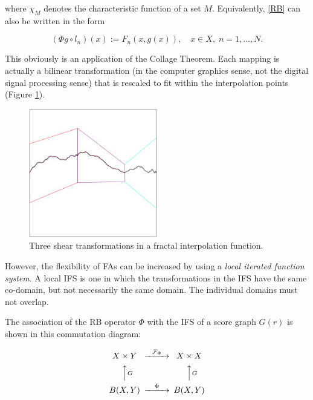 \documentclass[english,11pt,letterpaper,onecolumn]{scrartcl}
\numberwithin{equation}{section}
\newcommand{\cF}{\mathcal{F}}
\newcommand{\be}{\begin{equation}}
\newcommand{\ee}{\end{equation}}
\begin{document}
\noindent where $\chi_M$ denotes the characteristic function of a set $M$.
Equivalently, \eqref{RB} can also be written in the form

\be\label{3.3}
(\Phi g \circ l_n) (x) := F_n (x, g(x)),\quad x\in X, \;n = 1, \ldots, N.
\ee


This obviously is an application of the Collage Theorem. Each mapping is
actually a bilinear transformation (in the computer graphics sense, not the
digital signal processing sense) that is rescaled to fit within the
interpolation points (Figure \ref{fig:fif}).

\begin{figure}
\centerline{\includegraphics[width = 0.5\textwidth]{interp}}
\caption{\label{fig:fif} Three shear transformations in
a fractal interpolation function.\protect\footnotemark}
\end{figure}


However, the flexibility of FAs can be increased by using a
\textit{local iterated function system}. A local IFS is one in which the
transformations in the IFS have the same co-domain, but not necessarily the
same domain. The individual domains must not overlap.

The association of the RB operator $\Phi$ with the IFS of a score graph $G(r)$ is
shown in this commutation diagram:

\be
\begin{CD}
X\times Y @>\cF_\Phi>> X\times X\\
@AAGA                  @AAGA\\
B(X,Y) @>\Phi>>  B(X,Y)
\end{CD}
\ee
\end{document}
